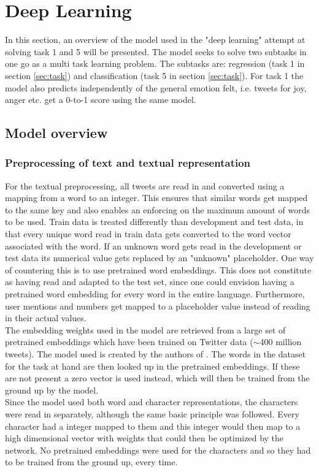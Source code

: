
\section{Deep Learning} \label{sec:deep}
In this section, an overview of the model used in the "deep learning" attempt at solving task 1 and 5 will be presented. The model seeks to solve two subtasks in one go as a multi task learning problem. The subtasks are: regression (task 1 in section \ref{sec:task}) and classification (task 5 in section \ref{sec:task}). For task 1 the model also predicts independently of the general emotion felt, i.e. tweets for joy, anger etc. get a 0-to-1 score using the same model.

\subsection{Model overview}

\subsubsection{Preprocessing of text and textual representation} \label{sec:preprop}
For the textual preprocessing, all tweets are read in and converted using a mapping from a word to an integer. This ensures that similar words get mapped to the same key and also enables an enforcing on the maximum amount of words to be used. Train data is treated differently than development and test data, in that every unique word read in train data gets converted to the word vector associated with the word. If an unknown word gets read in the development or test data its numerical value gets replaced by an "unknown" placeholder. One way of countering this is to use pretrained word embeddings. This does not constitute as having read and adapted to the test set, since one could envision having a pretrained word embedding for every word in the entire language. Furthermore, user mentions and numbers get mapped to a placeholder value instead of reading in their actual values.\\
The embedding weights used in the model are retrieved from a large set of pretrained embeddings which have been trained on Twitter data ($\sim$400 million tweets). The model used is created by the authors of \cite{godin}. The words in the dataset for the task at hand are then looked up in the pretrained embeddings. If these are not present a zero vector is used instead, which will then be trained from the ground up by the model.\\
Since the model used both word and character representations, the characters were read in separately, although the same basic principle was followed. Every character had a integer mapped to them and this integer would then map to a high dimensional vector with weights that could then be optimized by the network. No pretrained embeddings were used for the characters and so they had to be trained from the ground up, every time.

